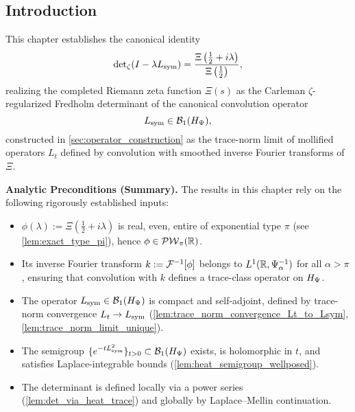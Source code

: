 \subsection*{Introduction}
\label{sec:det_intro}

This chapter establishes the canonical identity
\begin{equation}
\label{eq:zeta_det_identity}
\det\nolimits_\zeta(I - \lambda L_{\mathrm{sym}}) 
= \frac{\Xi\left( \tfrac{1}{2} + i\lambda \right)}{\Xi\left( \tfrac{1}{2} \right)},
\end{equation}
realizing the completed Riemann zeta function \( \Xi(s) \) as the Carleman \(\zeta\)-regularized Fredholm determinant of the canonical convolution operator
\[
L_{\mathrm{sym}} \in \mathcal{B}_1(H_{\Psi}),
\]
constructed in \cref{sec:operator_construction} as the trace-norm limit of mollified operators \( L_t \) defined by convolution with smoothed inverse Fourier transforms of \( \Xi \).

\begin{previewbox}
\textbf{Analytic Preconditions (Summary).}
The results in this chapter rely on the following rigorously established inputs:

\begin{itemize}
  \item \( \phi(\lambda) := \Xi(\tfrac{1}{2} + i\lambda) \) is real, even, entire of exponential type \( \pi \) (see \cref{lem:exact_type_pi}), hence \( \phi \in \mathcal{PW}_{\pi}(\mathbb{R}) \).
  \item Its inverse Fourier transform \( k := \mathcal{F}^{-1}[\phi] \) belongs to \( L^1(\mathbb{R}, \Psi_\alpha^{-1}) \) for all \( \alpha > \pi \), ensuring that convolution with \( k \) defines a trace-class operator on \( H_{\Psi} \).
  \item The operator \( L_{\mathrm{sym}} \in \mathcal{B}_1(H_{\Psi}) \) is compact and self-adjoint, defined by trace-norm convergence \( L_t \to L_{\mathrm{sym}} \) (\cref{lem:trace_norm_convergence_Lt_to_Lsym}, \cref{lem:trace_norm_limit_unique}).
  \item The semigroup \( \{ e^{-t L_{\mathrm{sym}}^2} \}_{t > 0} \subset \mathcal{B}_1(H_{\Psi}) \) exists, is holomorphic in \( t \), and satisfies Laplace-integrable bounds (\cref{lem:heat_semigroup_wellposed}).
  \item The determinant is defined locally via a power series (\cref{lem:det_via_heat_trace}) and globally by Laplace–Mellin continuation.
\end{itemize}
\end{previewbox}

\medskip

